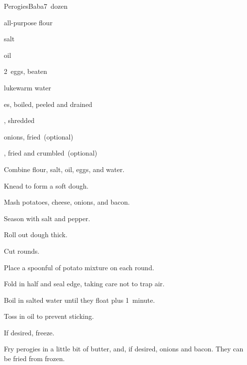 \begin{recipe}{Perogies}{Baba}{7~dozen}

\begin{ingredients}
\item {} all-purpose flour
\item \tp{1\half} salt
\item {} oil
\item 2~eggs, beaten
\item \C{1\half} lukewarm water
\item \lbs{2\half} es, boiled, peeled and drained
\item \lbs{\half} , shredded
\item onions, fried~(optional)
\item {}, fried and crumbled~(optional)
\end{ingredients}

\begin{directions}
\item Combine flour, salt, oil, eggs, and water.
\item Knead to form a soft dough.
\item Mash potatoes, cheese, onions, and bacon.
\item Season with salt and pepper.
\item Roll out dough \inch{\eighth} thick.
\item Cut  rounds.
\item Place a spoonful of potato mixture on each round.
\item Fold in half and seal edge, taking care not to trap air.
\item Boil in salted water until they float plus 1~minute.
\item Toss in oil to prevent sticking.
\item If desired, freeze.
\item Fry perogies in a little bit of butter, and, if desired, onions and bacon. They can be fried from frozen.
\end{directions}

\end{recipe}
